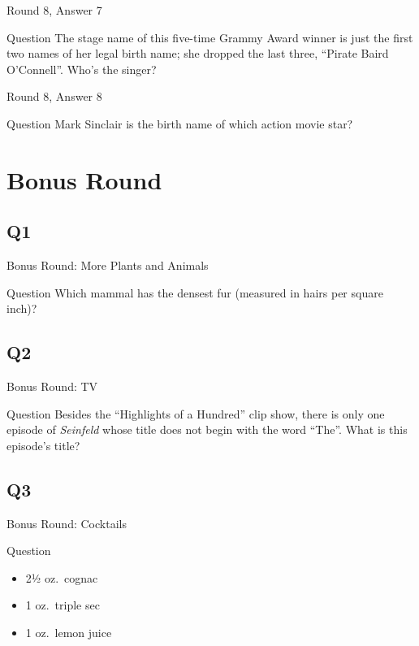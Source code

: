 \documentclass[11pt]{beamer}
\begin{document}
\begin{frame}[t]{Round 8, Answer 7}
\begin{block}{Question}
The stage name of this five-time Grammy Award winner is just the first two names of her legal birth name; she dropped the last three, ``Pirate Baird O'Connell''. Who's the singer?
\end{block}
\end{frame}
\begin{frame}[t]{Round 8, Answer 8}
\begin{block}{Question}
Mark Sinclair is the birth name of which action movie star?
\end{block}
\end{frame}
\def\thisSectionName{Bonus}
\section{Bonus Round}
\subsection*{Q1}
\begin{frame}[t]{Bonus Round: More Plants and Animals}
\begin{block}{Question}
Which mammal has the densest fur (measured in hairs per square inch)?
\end{block}
\end{frame}
\subsection*{Q2}
\begin{frame}[t]{Bonus Round: TV}
\begin{block}{Question}
Besides the ``Highlights of a Hundred'' clip show, there is only one episode of \emph{Seinfeld} whose title does not begin with the word ``The''. What is this episode's title?
\end{block}
\end{frame}
\subsection*{Q3}
\begin{frame}[t]{Bonus Round: Cocktails}
\begin{block}{Question}
\begin{itemize}
\item 2½ oz.\ cognac
\item 1 oz.\ triple sec
\item 1 oz.\ lemon juice
\end{itemize}
\end{block}
\end{frame}
\end{document}
